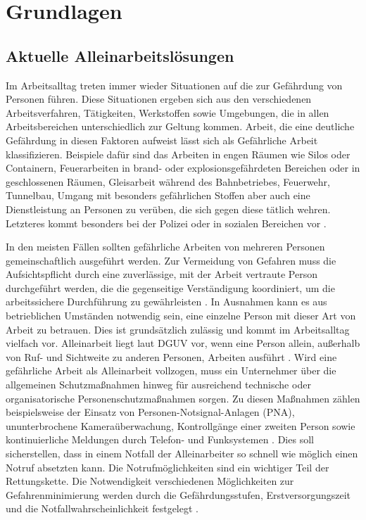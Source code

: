 \documentclass[thesis.tex]{subfiles}
\begin{document}
\chapter{Grundlagen}\label{chap:grundlagen}

\section{Aktuelle Alleinarbeitslösungen}\label{chap:alleinarbeit}

Im Arbeitsalltag treten immer wieder Situationen auf die zur Gefährdung von Personen führen.
Diese Situationen ergeben sich aus den verschiedenen Arbeitsverfahren, Tätigkeiten, Werkstoffen sowie Umgebungen, die in allen Arbeitsbereichen unterschiedlich zur Geltung kommen.
Arbeit, die eine deutliche Gefährdung in diesen Faktoren aufweist lässt sich als \glqq Gefährliche Arbeit\grqq{} klassifizieren.
Beispiele dafür sind das Arbeiten in engen Räumen wie Silos oder Containern, Feuerarbeiten in brand- oder explosionsgefährdeten Bereichen oder in geschlossenen Räumen, Gleisarbeit während des Bahnbetriebes, Feuerwehr, Tunnelbau, Umgang mit besonders gefährlichen Stoffen aber auch eine Dienstleistung an Personen zu verüben, die sich gegen diese tätlich wehren.
Letzteres kommt besonders bei der Polizei oder in sozialen Bereichen vor \cite[vgl. S.41 2.7.1]{Regel_100-001}.

In den meisten Fällen sollten gefährliche Arbeiten von mehreren Personen gemeinschaftlich ausgeführt werden.
Zur Vermeidung von Gefahren muss die Aufsichtspflicht durch eine zuverlässige, mit der Arbeit vertraute Person durchgeführt werden, die die gegenseitige Verständigung koordiniert, um die arbeitssichere Durchführung zu gewährleisten \cite[vgl. §8.1]{Vorschrift1_DGUV}.
In Ausnahmen kann es aus betrieblichen Umständen notwendig sein, eine einzelne Person mit dieser Art von Arbeit zu betrauen. Dies ist grundsätzlich zulässig und kommt im Arbeitsalltag vielfach vor.
Alleinarbeit liegt laut DGUV vor, wenn eine Person allein, außerhalb von Ruf- und Sichtweite zu anderen Personen, Arbeiten ausführt \cite[S.41 2.7.2]{Regel_100-001}.
Wird eine gefährliche Arbeit als Alleinarbeit vollzogen, muss ein Unternehmer über die allgemeinen Schutzmaßnahmen hinweg für ausreichend technische oder organisatorische Personenschutzmaßnahmen sorgen.
Zu diesen Maßnahmen zählen beispielsweise der Einsatz von Personen-Notsignal-Anlagen (PNA), ununterbrochene Kameraüberwachung, Kontrollgänge einer zweiten Person sowie kontinuierliche Meldungen durch Telefon- und Funksystemen \cite[vgl. S.43 2.7.2]{Regel_100-001}.
Dies soll sicherstellen, dass in einem Notfall der Alleinarbeiter so schnell wie möglich einen Notruf absetzten kann.
Die Notrufmöglichkeiten sind ein wichtiger Teil der Rettungskette.
Die Notwendigkeit verschiedenen Möglichkeiten zur Gefahrenminimierung werden durch die Gefährdungsstufen, Erstversorgungszeit und die Notfallwahrscheinlichkeit festgelegt \cite[vgl. S.13-18]{Regel_112-139}.
\end{document}
